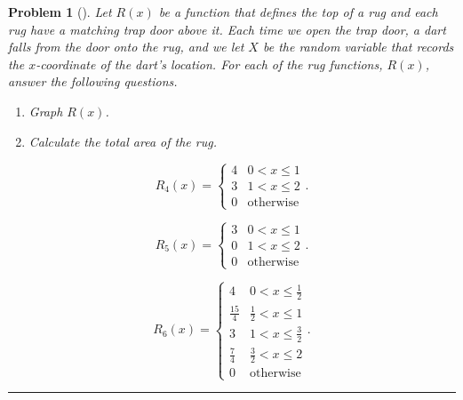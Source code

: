 \documentclass[letterpaper,oneside]{book}%
\theoremstyle{plain}
\theoremstyle{box}
\theoremstyle{problem}
\newtheorem{problemnum}{Problem}[chapter]
\newenvironment{problem}[1][]{\begin{problemnum}[#1]}{\end{problemnum}\nopagebreak\hrule\bigskip}
\begin{document}
\begin{problem}
\label{D3_ApproxArea}
Let $R(x)$ be a function that defines the top of a rug and each rug have a matching trap door above it. Each time we open the trap door, a dart falls from the door onto the rug, and we let $X$ be the random variable that records the $x$-coordinate of the dart's location. For each of the rug functions, $R(x)$, answer the following questions.
\begin{enumerate}
\item Graph $R(x)$.
\item Calculate the total area of the rug.
\end{enumerate}
% 

$$R_4(x) = 
    \begin{cases}
    4 & 0 < x \leq 1 \\
    3 & 1 < x \leq 2 \\
    0 & \text{otherwise}
    \end{cases}.$$

$$R_5(x) = 
    \begin{cases}
    3 & 0 < x \leq 1 \\
    0 & 1 < x \leq 2 \\
    0 & \text{otherwise}
    \end{cases}.$$

$$R_6(x) = 
    \begin{cases}
    4 & 0 < x \leq \frac{1}{2} \\
    \frac{15}{4} & \frac{1}{2} < x \leq 1 \\
    3 & 1 < x \leq \frac{3}{2} \\
    \frac{7}{4} & \frac{3}{2} < x \leq 2 \\
    0 & \text{otherwise}
    \end{cases}.$$


\end{problem}
\end{document}
